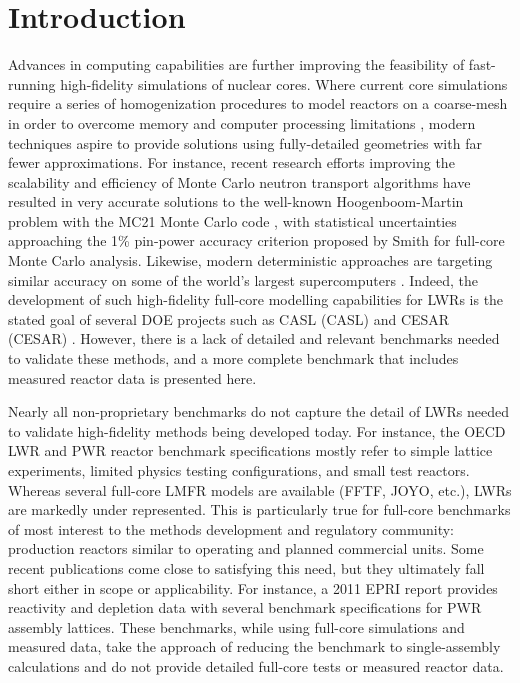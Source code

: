 \section{Introduction}

Advances in computing capabilities are further improving the feasibility of
fast-running high-fidelity simulations of nuclear cores. Where current core
simulations require a series of homogenization procedures to model reactors on a
coarse-mesh in order to overcome memory and computer processing limitations
\cite{Smith1986303}, modern techniques aspire to provide solutions using
fully-detailed geometries with far fewer approximations. For instance, recent
research efforts improving the scalability and efficiency of Monte Carlo neutron
transport algorithms have resulted in very accurate solutions to the well-known
Hoogenboom-Martin problem \cite{HM_bench} with the MC21 Monte Carlo code
\cite{mc21_hoomartin2010} \cite{mc21_hoomartin2012}, with statistical
uncertainties approaching the 1\% pin-power accuracy criterion proposed by Smith
\cite{kordsmithchallenge} for full-core Monte Carlo analysis. Likewise, modern
deterministic approaches are targeting similar accuracy on some of the world's
largest supercomputers \cite{denovo_jaguar2012}. Indeed, the development of such
high-fidelity full-core modelling capabilities for \acp{LWR} is the stated goal
of several DOE projects such as \acs{CASL} (\acl{CASL}) \cite{casl_goals} and
\acs{CESAR} (\acl{CESAR}) \cite{cesar_goals}. However, there is a lack of
detailed and relevant benchmarks needed to validate these methods, and a more
complete benchmark that includes measured reactor data is presented here.

Nearly all non-proprietary benchmarks do not capture the detail of \acp{LWR}
needed to validate high-fidelity methods being developed today. For instance,
the OECD \ac{LWR} and \ac{PWR} reactor benchmark specifications
\cite{oecd_bench} mostly refer to simple lattice experiments, limited physics
testing configurations, and small test reactors. Whereas several full-core
\acs{LMFR} models are available (\acs{FFTF}, JOYO, etc.), \acp{LWR} are markedly
under represented. This is particularly true for full-core benchmarks of most
interest to the methods development and regulatory community: production
reactors similar to operating and planned commercial units. Some recent
publications come close to satisfying this need, but they ultimately fall short
either in scope or applicability. For instance, a 2011 \acs{EPRI} report
\cite{epri2011bench} provides reactivity and depletion data with several
benchmark specifications for \ac{PWR} assembly lattices. These benchmarks, while
using full-core simulations and measured data, take the approach of reducing the
benchmark to single-assembly calculations and do not provide detailed full-core
tests or measured reactor data.

